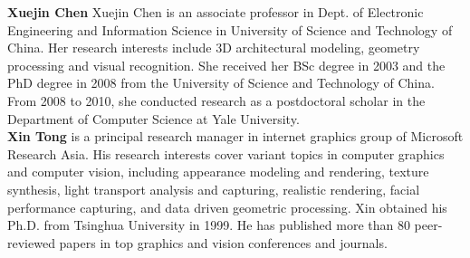 \noindent \textbf{Xuejin Chen} Xuejin Chen is an associate professor in Dept. of Electronic Engineering and Information Science in University of Science and Technology of China. Her research interests include 3D architectural modeling, geometry processing and visual recognition. She received her BSc degree in 2003 and the PhD degree in 2008 from the University of Science and Technology of China. From 2008 to 2010, she conducted research as a postdoctoral scholar in the Department of Computer Science at Yale University.  \\

\noindent \textbf{Xin Tong} is a principal research manager in internet graphics group of Microsoft Research Asia. His research interests cover variant topics in computer graphics and computer vision, including appearance modeling and rendering, texture synthesis, light transport analysis and capturing, realistic rendering, facial performance capturing, and data driven geometric processing. Xin obtained his Ph.D. from Tsinghua University in 1999. He has published more than 80 peer-reviewed papers in top graphics and vision conferences and journals.


